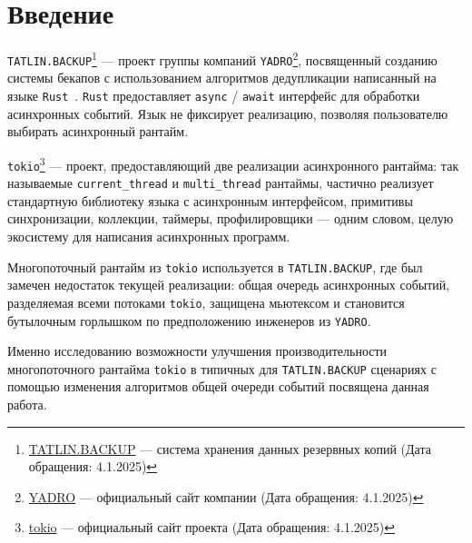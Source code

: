 
\section*{Введение}
\thispagestyle{withCompileDate}

\verb|TATLIN.BACKUP|\footnote{\href{https://yadro.com/ru/tatlin/backup}{TATLIN.BACKUP}
--- система хранения данных резервных копий (Дата обращения: 4.1.2025)} --- проект группы компаний \verb|YADRO|\footnote{\href{https://yadro.com/}{YADRO} --- официальный сайт компании (Дата обращения: 4.1.2025)}, посвященный созданию системы бекапов с использованием алгоритмов дедупликации написанный на языке \verb|Rust|~\cite{RustCommunity}. \verb|Rust| предоставляет \verb|async| / \verb|await|\cite{fsharpasyncawait} интерфейс для обработки асинхронных событий. Язык не фиксирует реализацию, позволяя пользователю выбирать асинхронный рантайм.

\verb|tokio|\footnote{\href{https://tokio.rs/}{tokio} --- официальный сайт проекта (Дата обращения: 4.1.2025)} --- проект, предоставляющий две реализации асинхронного рантайма: так называемые \verb|current_thread| и \verb|multi_thread| рантаймы, частично реализует стандартную библиотеку языка с асинхронным интерфейсом, примитивы синхронизации, коллекции, таймеры, профилировщики --- одним словом, целую экосистему для написания асинхронных программ.

Многопоточный рантайм из \verb|tokio| используется в \verb|TATLIN.BACKUP|, где был замечен недостаток текущей реализации: общая очередь асинхронных событий, разделяемая всеми потоками \verb|tokio|, защищена мьютексом и становится бутылочным горлышком по предположению инженеров из \verb|YADRO|.

Именно исследованию возможности улучшения производительности многопоточного рантайма \verb|tokio| в типичных для \verb|TATLIN.BACKUP| сценариях с помощью изменения алгоритмов общей очереди событий посвящена данная работа.
